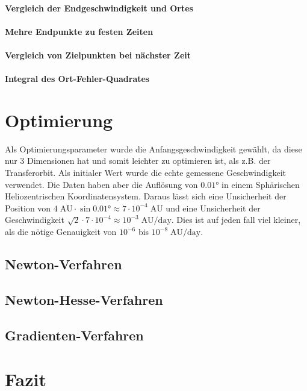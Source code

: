 \paragraph{Vergleich der Endgeschwindigkeit und Ortes}
\paragraph{Mehre Endpunkte zu festen Zeiten}
\paragraph{Vergleich von Zielpunkten bei nächster Zeit}
\paragraph{Integral des Ort-Fehler-Quadrates}

\section{Optimierung}
Als Optimierungsparameter wurde die Anfangsgeschwindigkeit gewählt, da diese nur 3 Dimensionen hat und somit leichter zu optimieren ist, als z.B. der Transferorbit.
Als initialer Wert wurde die echte gemessene Geschwindigkeit verwendet. Die Daten haben aber die Auflösung von $0.01\text{°}$ in einem Sphärischen Heliozentrischen Koordinatensystem.
Daraus lässt sich eine Unsicherheit der Position von $4\;\text{AU}\cdot\sin 0.01\text{°}\approx 7\cdot 10^{-4}\;\text{AU}$ und eine Unsicherheit der Geschwindigkeit $\sqrt{2}\cdot 7\cdot 10^{-4} \approx 10^{-3}\;\text{AU/day}$.
Dies ist auf jeden fall viel kleiner, als die nötige Genauigkeit von $10^{-6}$ bis $10^{-8}\;\text{AU/day}$.

\subsection{Newton-Verfahren}
\subsection{Newton-Hesse-Verfahren}
\subsection{Gradienten-Verfahren}

\section{Fazit}




